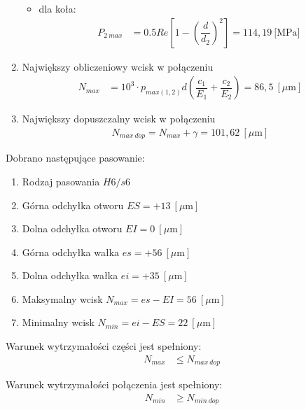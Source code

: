 \begin{enumerate}
\begin{itemize}
				\item dla koła:
				\begin{align}
				P_{2 \ max} &= 0.5 Re \left[1 - \left(\dfrac{d}{d_2}\right)^2\right] = 114,19 \ \text{[MPa]}
				\end{align}
			\end{itemize}

			\item Największy obliczeniowy wcisk w połączeniu
			\begin{align}
				N_{max} &= 10^3 \cdot p_{max (1,2)} d \left(\dfrac{c_1}{E_1} + \dfrac{c_2}{E_2}\right) = 86,5 \ [\mu \text{m}] 
			\end{align}

			\item Największy dopuszczalny wcisk w połączeniu
			\begin{align}
				N_{max \ dop} = N_{max} + \gamma = 101,62 \ [\mu \text{m}]
			\end{align}
			\end{enumerate}
			
			\par Dobrano następujące pasowanie:
			\begin{enumerate}
				\item Rodzaj pasowania \tab $H6/s6$
				\item Górna odchyłka otworu	\tab $ES = +13 \ [\mu \text{m}]$
				\item Dolna odchyłka otworu \tab $EI = 0 \ [\mu \text{m}]$
				\item Górna odchyłka wałka \tab $es = +56 \ [\mu \text{m}]$
				\item Dolna odchyłka wałka \tab $ei = +35 \ [\mu \text{m}]$
				\item Maksymalny wcisk \tab $N_{max} = es - EI = 56 \ [\mu \text{m}]$
				\item Minimalny wcisk \tab $N_{min} = ei - ES = 22 \ [\mu \text{m}]$ \\
			\end{enumerate}
		
		
		\noindent Warunek wytrzymałości części jest spełniony:
		\begin{align}
			N_{max} &\leq N_{max \ dop} 
		\end{align}
		
		\noindent Warunek wytrzymałości połączenia jest spełniony:
		\begin{align}
			N_{min} &\geq N_{min \ dop} 
		\end{align}
		
